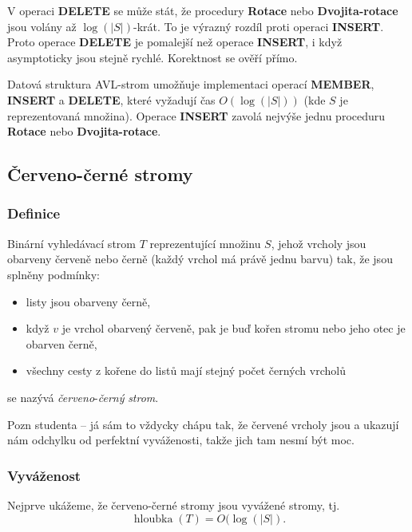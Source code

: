 \documentclass[a4paper,12pt]{article}
\DeclareMathOperator*{\hloubka}{hloubka}
\begin{document}
V operaci {\bf DELETE} se může stát, že procedury 
{\bf Rotace} nebo {\bf Dvojita-rotace} jsou volány až $\log(
|S|)$-krát. 
To je výrazný rozdíl proti operaci {\bf INSERT}. Proto operace 
{\bf DELETE} je pomalejší než operace {\bf INSERT}, i když 
asymptoticky jsou stejně rychlé. Korektnost se 
ověří přímo.

\begin{veta}Datová struktura AVL-strom 
umožňuje implementaci operací {\bf MEMBER}, {\bf INSERT} a 
{\bf DELETE}, které vyžadují čas $O(\log(|S|))$ (kde $
S$ je 
reprezentovaná množina).  Ope\-race {\bf INSERT} zavolá 
nejvýše jednu proceduru {\bf Rotace} nebo {\bf Dvo\-ji\-ta-rotace}.  
\end{veta}
\subsection{Červeno-černé stromy}

\subsubsection{Definice}

Binární vyhledávací strom $T$ reprezentující 
množinu $S$, jehož vrcholy jsou obarveny červeně nebo 
černě (každý vrchol má právě jednu barvu) tak, že jsou 
splněny podmínky:
\begin{itemize}
\item
listy jsou obarveny černě,
\item
když $v$ je vrchol obarvený červeně, pak je buď kořen 
stromu nebo jeho otec je obarven černě,
\item
všechny cesty z kořene do listů mají stejný 
počet čer\-ných vrcholů
\end{itemize}
se nazývá \emph{červeno}-\emph{černý} \emph{strom}. 

Pozn studenta -- já sám to vždycky chápu tak, že červené vrcholy jsou  a ukazují nám odchylku od perfektní vyváženosti, takže jich tam nesmí být moc.

\subsubsection{Vyváženost}
Nejprve ukážeme, že červeno-černé stromy jsou 
vyvážené stro\-my, tj. $$\hloubka(T)=O(\log(|S|).$$
\end{document}
